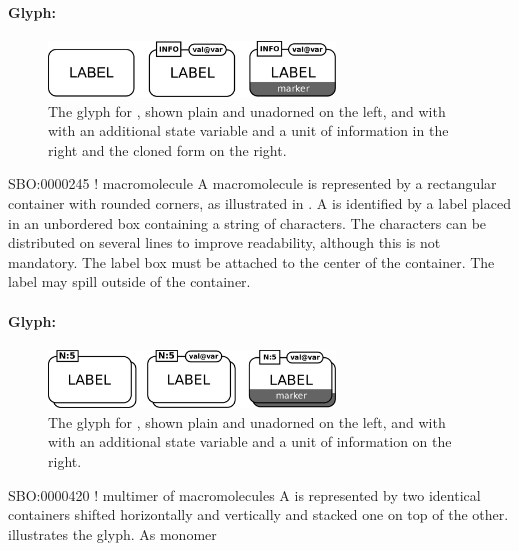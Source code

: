 \paragraph{Glyph: }

\begin{figure}[H]
  \centering
  \includegraphics[width = 3in]{images/macromolecule}
  \caption{The \PD glyph for , shown plain and
    unadorned on the left, and with with an additional state variable and a
    unit of information in the right and the cloned form on the right.}
  \label{fig:macromolecule}
\end{figure}

\begin{glyphDescription}
\glyphSboTerm SBO:0000245 ! macromolecule 
\glyphContainer A macromolecule is represented by a rectangular container with rounded
corners, as illustrated in .
\glyphLabel A  is identified by a label placed in an unbordered box containing a string of characters.  The characters can be distributed on several lines to improve readability, although this is not mandatory.  The label box must be attached to the center of the container.  The label may spill outside of the container.
\end{glyphDescription}

\paragraph{Glyph: }

\begin{figure}[H]
  \centering
  \includegraphics[width = 3.0in]{images/macromolMultimer}
  \caption{The \PD glyph for , shown plain and
    unadorned on the left, and with with an additional state variable and a
    unit of information on the right.}
  \label{fig:macromolMultimer}
\end{figure}

\begin{glyphDescription}
\glyphSboTerm SBO:0000420 ! multimer of macromolecules
\glyphContainer A  is represented by two identical containers shifted horizontally and vertically and stacked one on top of the other.   illustrates the glyph.
\glyphLabel As monomer
\end{glyphDescription}

